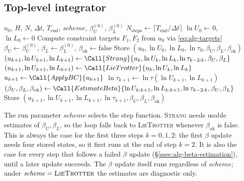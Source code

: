 \subsection{Top-level integrator}\label{ssec:alg-top-level}
\begin{algorithm}[H]
\caption{Top-level integrator}
\begin{algorithmic}[1]
\Require $u_0$, $H$, $N$, $\Delta t$, $T_{\mathrm{end}}$, $\mathit{scheme}$, $\beta_U^{(0)}$, $\beta_L^{(0)}$
\State $N_{\mathrm{steps}} \gets \lceil T_{\mathrm{end}}/\Delta t \rceil$
\State $\ln U_0 \gets 0$, $\ln L_0 \gets 0$
\State Compute constraint targets $F_1, F_2$ from $u_0$ via \eqref{eq:alg-targets}
\State $\beta_U \gets \beta_U^{(0)}$, $\beta_L \gets \beta_L^{(0)}$, $\beta_{\mathrm{ok}} \gets \text{false}$
\State Store $(u_0, \ln U_0, \ln L_0, \ln \tau_0, \beta_U, \beta_L, \beta_{\mathrm{ok}})$
    \State $(u_{k+1}, \ln U_{k+1}, \ln L_{k+1}) \gets \Call{Strang}{u_k, \ln U_k, \ln L_k, \ln \tau_{k-2:k}, \beta_U, \beta_L}$ \Comment{\S\ref{ssec:alg-strang}}
  \Else
    \State $(u_{k+1}, \ln U_{k+1}, \ln L_{k+1}) \gets \Call{LieTrotter}{u_k, \ln U_k, \ln L_k}$ \Comment{\S\ref{ssec:alg-lie-trotter}}
  \EndIf
  \State $u_{k+1} \gets \Call{ApplyBC}{u_{k+1}}$ 
  \State $\ln \tau_{k+1} \gets \ln \tau(\ln U_{k+1}, \ln L_{k+1})$ \Comment{\eqref{eq:1d-ln-clock}, \eqref{eq:ns-ln-clock}}
    \State $(\beta_U, \beta_L, \beta_{\mathrm{ok}}) \gets \Call{EstimateBeta}{\ln U_{k:k+1}, \ln L_{k:k+1}, \ln \tau_{k-2:k}, \beta_U, \beta_L}$ \Comment{\S\ref{ssec:alg-beta-estimation}}
  \EndIf
  \State Store $(u_{k+1}, \ln U_{k+1}, \ln L_{k+1}, \ln \tau_{k+1}, \beta_U, \beta_L, \beta_{\mathrm{ok}})$
\EndFor
\end{algorithmic}
\end{algorithm}

The run parameter $\mathit{scheme}$ selects the step function. \textsc{Strang}
needs usable estimates of $\beta_U, \beta_L$, so the loop falls back to
\textsc{LieTrotter} whenever $\beta_{\mathrm{ok}}$ is false. This is always
the case for the first three steps $k = 0, 1, 2$: the first $\beta$ update
needs four stored states, so it first runs at the end of step $k = 2$. It is
also the case for every step that follows a failed $\beta$ update
(\S\ref{ssec:alg-beta-estimation}), until a later update succeeds. The $\beta$
update itself runs regardless of $\mathit{scheme}$; under
$\mathit{scheme} = \textsc{LieTrotter}$ the estimates are diagnostic only.

